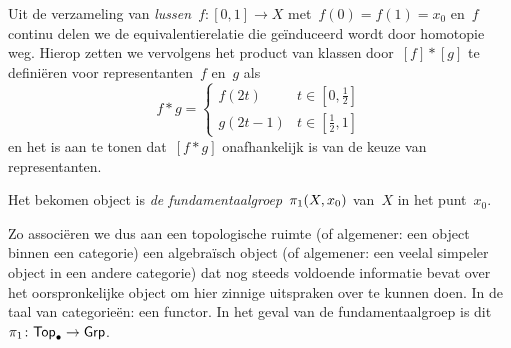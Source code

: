 \documentclass[a4paper,11pt,openany,oneside,article]{memoir}
\begin{document}
\begin{definition}
  Uit de verzameling van \emph{lussen}~$f\colon[0,1]\to X$ met~$f(0)=f(1)=x_0$ en~$f$ continu delen we de equivalentierelatie die ge\"induceerd wordt door homotopie weg. Hierop zetten we vervolgens het product van klassen door~$[f]\ast [g]$ te defini\"eren voor representanten~$f$ en~$g$ als
  \begin{equation}
    f\ast g=
      \begin{cases}
        f(2t) & t\in\left[0,\frac{1}{2}\right] \\
        g(2t-1) & t\in\left[\frac{1}{2},1\right]
      \end{cases}
  \end{equation}
  en het is aan te tonen dat~$[f\ast g]$ onafhankelijk is van de keuze van representanten.

  Het bekomen object is \emph{de fundamentaalgroep~$\pi_1(X,x_0)$} van~$X$ in het punt~$x_0$.
\end{definition}

Zo associ\"eren we dus aan een topologische ruimte (of algemener: een object binnen een categorie) een algebra\"isch object (of algemener: een veelal simpeler object in een andere categorie) dat nog steeds voldoende informatie bevat over het oorspronkelijke object om hier zinnige uitspraken over te kunnen doen. In de taal van categorie\"en: een functor. In het geval van de fundamentaalgroep is dit~$\pi_1\colon\mathsf{Top}_{\bullet}\to\mathsf{Grp}$.
\end{document}
